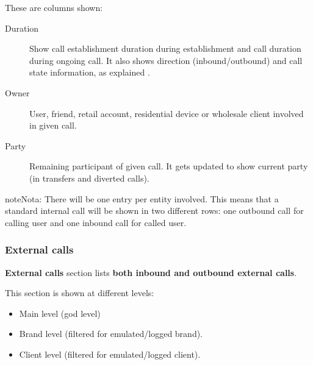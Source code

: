 \documentclass[letterpaper,10pt,spanish]{sphinxmanual}
\begin{document}
These are columns shown:
\begin{description}
\item[{Duration}] \leavevmode{}\label{administration_portal/client/wholesale/calls/active_calls:term-duration}
Show call establishment duration during establishment and call duration during ongoing call. It also shows
direction (inbound/outbound) and call state information, as explained {\hyperref[administration_portal/platform/active_calls:call\string-state]{}}.

\item[{Owner}] \leavevmode{}\label{administration_portal/client/wholesale/calls/active_calls:term-owner}
User, friend, retail account, residential device or wholesale client involved in given call.

\item[{Party}] \leavevmode{}\label{administration_portal/client/wholesale/calls/active_calls:term-party}
Remaining participant of given call. It gets updated to show current party (in transfers and diverted calls).

\end{description}

\begin{notice}{note}{Nota:}
There will be one entry per entity involved. This means that a standard internal call will be shown
in two different rows: one outbound call for calling user and one inbound call for called user.
\end{notice}


\subsubsection{External calls}
\label{administration_portal/client/wholesale/calls/external_calls:id1}\label{administration_portal/client/wholesale/calls/external_calls::doc}\label{administration_portal/client/wholesale/calls/external_calls:external-calls}
\textbf{External calls} section lists \textbf{both inbound and outbound external calls}.

This section is shown at different levels:
\begin{itemize}
\item {} 
Main level (god level)

\item {} 
Brand level (filtered for emulated/logged brand).

\item {} 
Client level (filtered for emulated/logged client).

\end{itemize}
\end{document}
